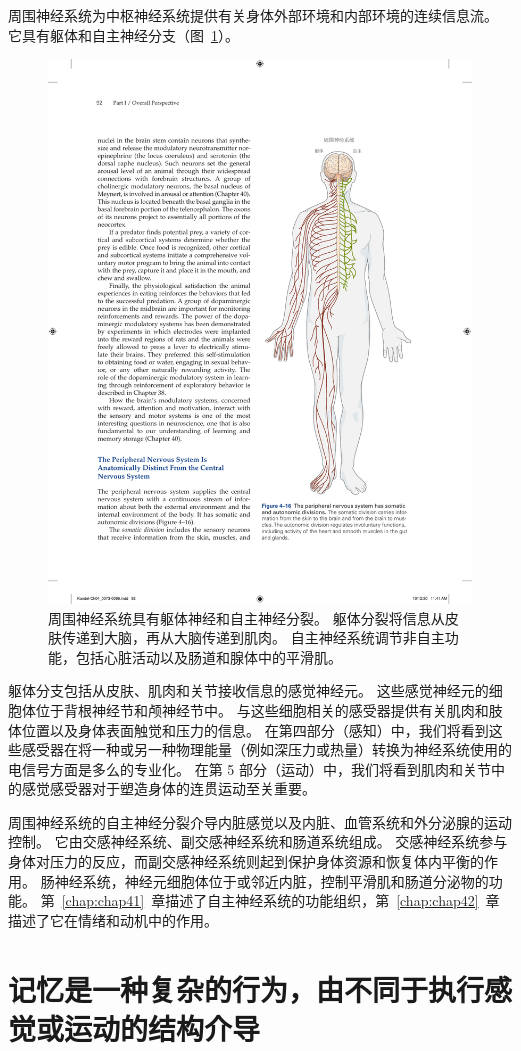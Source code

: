 周围神经系统为中枢神经系统提供有关身体外部环境和内部环境的连续信息流。 
它具有躯体和自主神经分支（图~\ref{fig:4_16}）。


\begin{figure}[htbp]
	\centering
	\includegraphics[width=0.55\linewidth]{chap04/fig_4_16}
	\caption{周围神经系统具有躯体神经和自主神经分裂。
		躯体分裂将信息从皮肤传递到大脑，再从大脑传递到肌肉。
		自主神经系统调节非自主功能，包括心脏活动以及肠道和腺体中的平滑肌。}
	\label{fig:4_16}
\end{figure}


躯体分支包括从皮肤、肌肉和关节接收信息的感觉神经元。 
这些感觉神经元的细胞体位于背根神经节和颅神经节中。 与这些细胞相关的感受器提供有关肌肉和肢体位置以及身体表面触觉和压力的信息。
在第四部分（感知）中，我们将看到这些感受器在将一种或另一种物理能量（例如深压力或热量）转换为神经系统使用的电信号方面是多么的专业化。 
在第 5 部分（运动）中，我们将看到肌肉和关节中的感觉感受器对于塑造身体的连贯运动至关重要。


周围神经系统的自主神经分裂介导内脏感觉以及内脏、血管系统和外分泌腺的运动控制。
它由交感神经系统、副交感神经系统和肠道系统组成。 
交感神经系统参与身体对压力的反应，而副交感神经系统则起到保护身体资源和恢复体内平衡的作用。
肠神经系统，神经元细胞体位于或邻近内脏，控制平滑肌和肠道分泌物的功能。 
第~\ref{chap:chap41}~章描述了自主神经系统的功能组织，第~\ref{chap:chap42}~章描述了它在情绪和动机中的作用。



\section{记忆是一种复杂的行为，由不同于执行感觉或运动的结构介导}

